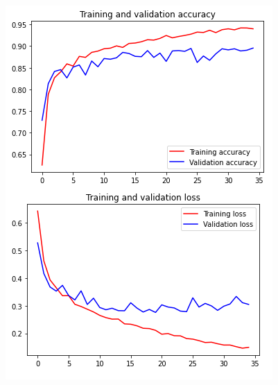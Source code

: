 \documentclass[11pt,a4paper,oneside]{article}
\begin{document}
\begin{figure}[h]
\begin{minipage}[c]{.4\textwidth}
		\includegraphics[width=.9\textwidth]{images/Task 3/VGG16 3.1/FT/Accuracy_drop}
	\end{minipage}
	

\end{figure}
\end{document}
